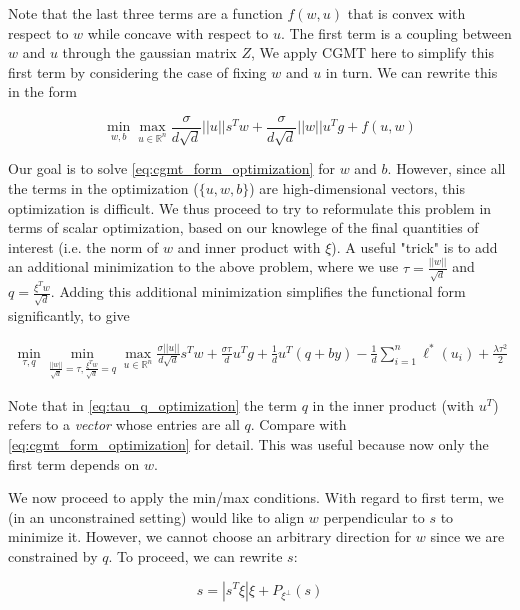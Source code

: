 Note that the last three terms are a function $f(w,u)$ that is convex with respect to $w$ while concave with respect to $u$. 
The first term is a coupling between $w$ and $u$ through the gaussian matrix $Z$,
We apply CGMT here to simplify this first term by considering the case of fixing $w$ and $u$ in turn.
We can rewrite this in the form 

\begin{equation}\label{eq:cgmt_form_optimization}
    \min_{w,b} \max_{u \in \mathbb{R}^n} \frac{\sigma}{d\sqrt{d}} ||u||s^Tw + \frac{\sigma}{d\sqrt{d}} ||w||u^Tg +
    f\left(u,w\right)
\end{equation}

Our goal is to solve \ref{eq:cgmt_form_optimization} for $w$ and $b$. 
However, since all the terms in the optimization ($\{u,w,b\}$) are high-dimensional vectors, this optimization is difficult. 
We thus proceed to try to reformulate this problem in terms of scalar optimization, based on our knowlege of the final quantities of interest (i.e. the norm of $w$ and inner product with $\xi$).
A useful "trick" is to add an additional minimization to the above problem, where we use $\tau = \frac{||w||}{\sqrt{d}}$ and $q = \frac{\xi^Tw}{\sqrt{d}}$. Adding this additional minimization simplifies the functional form significantly, to give

\begin{align}\label{eq:tau_q_optimization}
	\min_{\tau, q} \min_{\frac{||w||}{\sqrt{d}} =
	\tau, \frac{\xi^Tw}{\sqrt{d}} = q} \max_{u \in \mathbb{R}^n} \frac{\sigma||u||}{d\sqrt{d}} s^Tw + \frac{\sigma\tau}{d} u^Tg + 
	\frac{1}{d}u^T(q + by) - \frac{1}{d}\sum_{i=1}^n \ell^*(u_i) + \frac{\lambda\tau^2}{2}
\end{align}

Note that in \ref{eq:tau_q_optimization} the term $q$ in the inner product (with $u^T$) refers to a \textit{vector} whose entries are all $q$. 
Compare with \ref{eq:cgmt_form_optimization} for detail.
This was useful because now only the first term depends on $w$.

We now proceed to apply the min/max conditions.
With regard to first term, we (in an unconstrained setting) would like to align $w$ perpendicular to $s$ to minimize it. 
However, we cannot choose an arbitrary direction for $w$ since we are constrained by $q$.
To proceed, we can rewrite $s$:

\begin{equation}\label{eq:s_decomposition}
s = |s^T\xi|\xi + P_{\xi^{\perp}}(s)
\end{equation}

